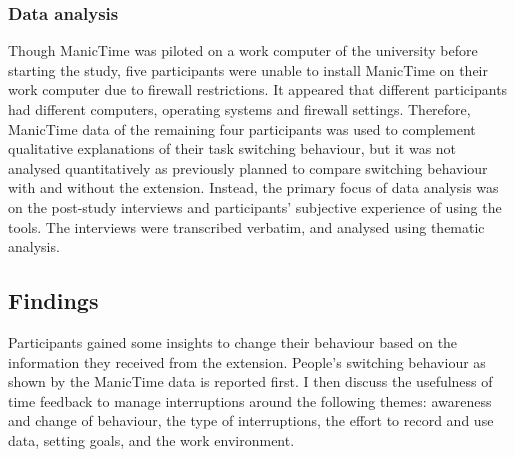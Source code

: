 \subsubsection{Data analysis}
Though ManicTime was piloted on a work computer of the university before starting the study, five participants were unable to install ManicTime on their work computer due to firewall restrictions. It appeared that different participants had different computers, operating systems and firewall settings. %
Therefore, ManicTime data of the remaining four participants was used to complement qualitative explanations of their task switching behaviour, but it was not analysed quantitatively as previously planned to compare switching behaviour with and without the extension. Instead, the primary focus of data analysis was on the post-study interviews and participants' subjective experience of using the tools. The interviews were transcribed verbatim, and analysed using thematic analysis.

\subsection{Findings}
Participants gained some insights to change their behaviour based on the information they received from the extension. People’s switching behaviour as shown by the ManicTime data is reported first. I then discuss the usefulness of time feedback to manage interruptions around the following themes: awareness and change of behaviour, the type of interruptions, the effort to record and use data, setting goals, and the work environment.

